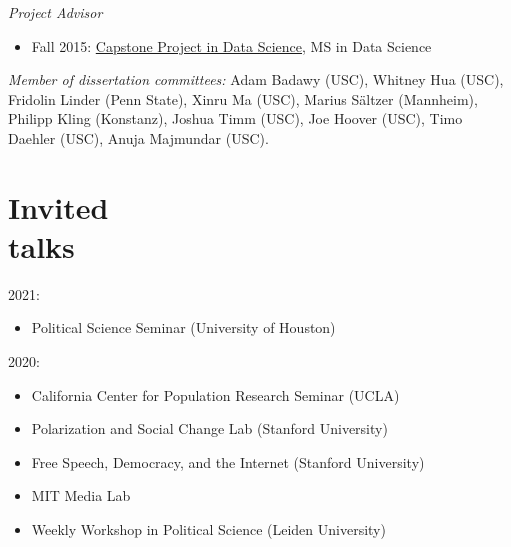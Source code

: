 \documentclass[margin,line,11pt]{resume}
\begin{document}
\begin{resume}
\emph{Project Advisor}
\begin{itemize}
\item Fall 2015: \href{http://cds.nyu.edu/academics/ms-in-data-science/curriculum/required-courses/#ds-ga-1006}{Capstone Project in Data Science}, MS in Data Science
\end{itemize}

\emph{Member of dissertation committees:} Adam Badawy (USC), Whitney Hua (USC), Fridolin Linder (Penn State), Xinru Ma (USC), Marius S\"{a}ltzer (Mannheim), Philipp Kling (Konstanz), Joshua Timm (USC), Joe Hoover (USC), Timo Daehler (USC), Anuja Majmundar (USC).




        \section{\mysidestyle Invited\\talks}
2021:
\begin{itemize}
\item Political Science Seminar (University of Houston)
\end{itemize}

2020:
\begin{itemize}
\item California Center for Population Research Seminar (UCLA)
\item Polarization and Social Change Lab (Stanford University)
\item Free Speech, Democracy, and the Internet (Stanford University)
\item MIT Media Lab
\item Weekly Workshop in Political Science (Leiden University)
\end{itemize}    
    

\end{resume}
\end{document}
